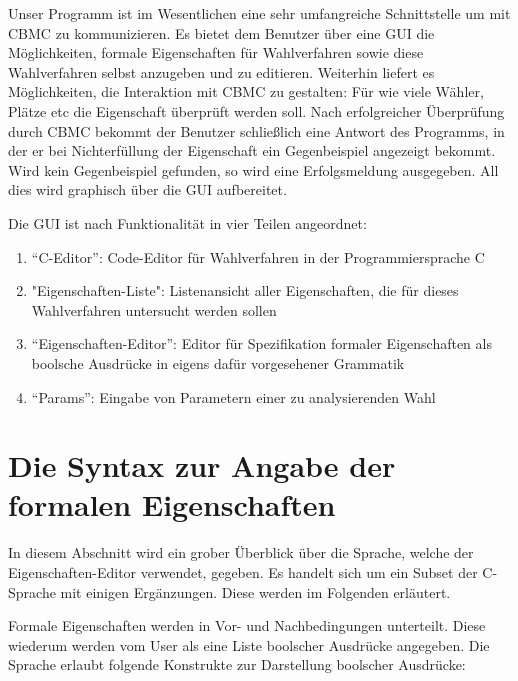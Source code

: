 \documentclass[a4paper]{scrreprt}
\begin{document}
Unser Programm ist im Wesentlichen eine sehr umfangreiche Schnittstelle um mit \ac{CBMC} zu kommunizieren. Es bietet dem \gls{Benutzer} über eine \ac{GUI} die Möglichkeiten, formale Eigenschaften für Wahlverfahren sowie diese Wahlverfahren selbst anzugeben und zu editieren. Weiterhin liefert es Möglichkeiten, die Interaktion mit \ac{CBMC} zu gestalten: Für wie viele Wähler, Plätze etc die Eigenschaft überprüft werden soll. Nach erfolgreicher Überprüfung durch \ac{CBMC} bekommt der \gls{Benutzer} schließlich eine Antwort des Programms, in der er bei Nichterfüllung der Eigenschaft ein Gegenbeispiel angezeigt bekommt. Wird kein Gegenbeispiel gefunden, so wird eine Erfolgsmeldung ausgegeben. All dies wird graphisch über die \ac{GUI} aufbereitet.

Die \ac{GUI} ist nach Funktionalität in vier Teilen angeordnet:
\begin{enumerate}
\item "`C-Editor"': Code-Editor für Wahlverfahren in der Programmiersprache C
\item "Eigenschaften-Liste": Listenansicht aller Eigenschaften, die für dieses Wahlverfahren untersucht werden sollen
\item "`Eigenschaften-Editor"': Editor für Spezifikation formaler Eigenschaften als boolsche Ausdrücke in eigens dafür vorgesehener Grammatik
\item "`Params"': Eingabe von Parametern einer zu analysierenden Wahl
\end{enumerate}

\section{Die Syntax zur Angabe der formalen Eigenschaften} \label{Sprache-für-formale-Eigenschaften}
In diesem Abschnitt wird ein grober Überblick über die Sprache, welche der Eigenschaften-Editor verwendet, gegeben. Es handelt sich um ein Subset der C-Sprache mit einigen Ergänzungen. Diese werden im Folgenden erläutert. 

Formale Eigenschaften werden in Vor- und Nachbedingungen unterteilt. Diese wiederum werden vom User als eine Liste boolscher Ausdrücke angegeben. Die Sprache erlaubt folgende Konstrukte zur Darstellung boolscher Ausdrücke:
\end{document}
